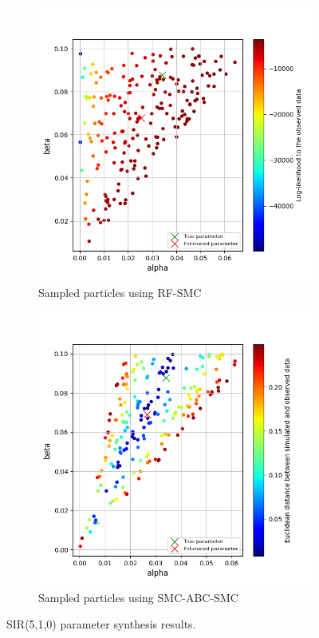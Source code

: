 \begin{figure}[H]
    \centering
    \begin{subfigure}{0.48\textwidth}
        \centering
        \includegraphics[width=\linewidth]{figures/sir510_rfsmc.png}
        \caption{Sampled particles using RF-SMC}
    \end{subfigure}
    \hfill
    \begin{subfigure}{0.48\textwidth}
        \centering
        \includegraphics[width=\linewidth]{figures/sir510_abcsmc.png}
        \caption{Sampled particles using SMC-ABC-SMC}
    \end{subfigure}
    \caption{SIR(5,1,0) parameter synthesis results.}
\end{figure}

